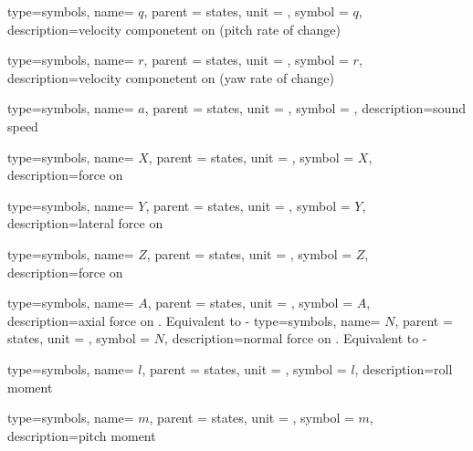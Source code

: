 {type=symbols,
	name= \ensuremath{q},
	parent = {states},
	unit = \unexpanded{\si{\radian\per\second}},
	symbol = \ensuremath{q},
	description={velocity componetent on  (pitch rate of change)}
}

{type=symbols,
	name= \ensuremath{r},
	parent = {states},
	unit = \unexpanded{\si{\radian\per\second}},
	symbol = \ensuremath{r},
	description={velocity componetent on  (yaw rate of change)}
}

{type=symbols,
	name= \ensuremath{a},
	parent = {states},
	unit = \unexpanded{\si{\meter\per\second}},
	symbol = ,
	description={sound speed}
}

{type=symbols,
	name= \ensuremath{X},
	parent = {states},
	unit = \unexpanded{\si{\newton}},
	symbol = \ensuremath{X},
	description={force on }
}

{type=symbols,
	name= \ensuremath{Y},
	parent = {states},
	unit = \unexpanded{\si{\newton}},
	symbol = \ensuremath{Y},
	description={lateral force on }
}



{type=symbols,
	name= \ensuremath{Z},
	parent = {states},
	unit = \unexpanded{\si{\newton}},
	symbol = \ensuremath{Z},
	description={force on }
}

{type=symbols,
	name= \ensuremath{A},
	parent = {states},
	unit = \unexpanded{\si{\newton}},
	symbol = \ensuremath{A},
	description={axial force on . Equivalent to -}
}
{type=symbols,
	name= \ensuremath{N},
	parent = {states},
	unit = \unexpanded{\si{\newton}},
	symbol = \ensuremath{N},
	description={normal force on . Equivalent to -}
}



{type=symbols,
	name= \ensuremath{l},
	parent = {states},
	unit = \unexpanded{\si{\newton\meter}},
	symbol = \ensuremath{l},
	description={roll moment}
}

{type=symbols,
	name= \ensuremath{m},
	parent = {states},
	unit = \unexpanded{\si{\newton\meter}},
	symbol = \ensuremath{m},
	description={pitch moment}
}

